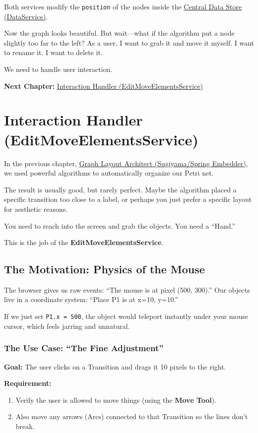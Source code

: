 \documentclass[a4paper,11pt,oneside]{report}
\begin{document}
Both services modify the \texttt{position} of the nodes inside the \hyperref[chap:dataservice]{Central Data Store (DataService)}.

Now the graph looks beautiful. But wait---what if the algorithm put a node slightly too far to the left? As a user, I want to grab it and move it myself. I want to rename it. I want to delete it.

We need to handle user interaction.

\textbf{Next Chapter:} \hyperref[chap:interaction]{Interaction Handler (EditMoveElementsService)}

\chapter{Interaction Handler (EditMoveElementsService)}
\label{chap:interaction}

In the previous chapter, \hyperref[chap:layout]{Graph Layout Architect (Sugiyama/Spring Embedder)}, we used powerful algorithms to automatically organize our Petri net.

The result is usually good, but rarely perfect. Maybe the algorithm placed a specific transition too close to a label, or perhaps you just prefer a specific layout for aesthetic reasons.

You need to reach into the screen and grab the objects. You need a ``Hand.''

This is the job of the \textbf{EditMoveElementsService}.

\section{The Motivation: Physics of the Mouse}

The browser gives us raw events: ``The mouse is at pixel (500, 300).''
Our objects live in a coordinate system: ``Place P1 is at x=10, y=10.''

If we just set \texttt{P1.x = 500}, the object would teleport instantly under your mouse cursor, which feels jarring and unnatural.

\subsection{The Use Case: ``The Fine Adjustment''}

\textbf{Goal:} The user clicks on a Transition and drags it 10 pixels to the right.

\textbf{Requirement:}
\begin{enumerate}
    \item Verify the user is allowed to move things (using the \textbf{Move Tool}).
    \item Also move any arrows (Arcs) connected to that Transition so the lines don't break.
\end{enumerate}
\end{document}
